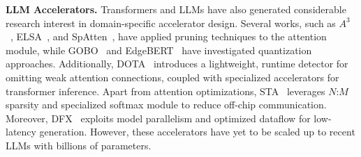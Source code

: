 \textbf{LLM Accelerators.} Transformers and LLMs have also generated considerable research interest in domain-specific accelerator design. Several works, such as $A^3$~\cite{ham20203}, ELSA~\cite{ham2021elsa}, and SpAtten~\cite{wang2021spatten}, have applied pruning techniques to the attention module, while GOBO~\cite{zadeh2020gobo} and EdgeBERT~\cite{tambe2021edgebert} have investigated quantization approaches. Additionally, DOTA~\cite{qu2022dota} introduces a lightweight, runtime detector for omitting weak attention connections, coupled with specialized accelerators for transformer inference. Apart from attention optimizations, STA~\cite{fang2022sta} leverages $N$:$M$ sparsity and specialized softmax module to reduce off-chip communication. Moreover, DFX~\cite{hong2022dfx} exploits model parallelism and optimized dataflow for low-latency generation. However, these accelerators have yet to be scaled up to recent LLMs with billions of parameters.
